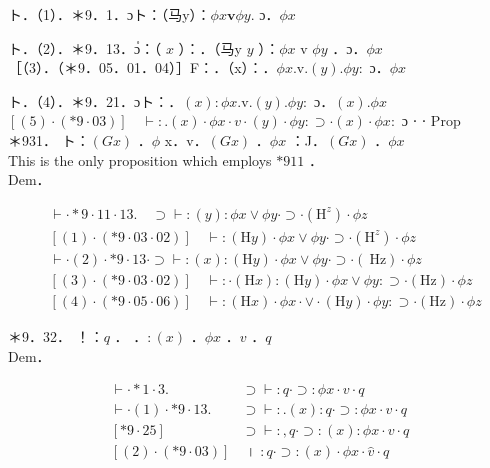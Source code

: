 \documentclass[10pt]{article}
\begin{document}
ト．（1）．＊9．1．ɔト：（马y）：$\phi x \mathbf{v} \phi y$. ɔ．$\phi x$

ト．（2）．＊9．13．ɔํ：（ $x$ ）：．（马y $y$ ）：$\phi x$ v $\phi y$ ．ɔ．$\phi x$\\
［（3）．（＊9．05．01．04）］F：．（x）：．$\phi x . \mathrm{v} .(y) . \phi y:$ ɔ．$\phi x$

ト．（4）．＊9．21．ɔト：．$(x): \phi x . \mathrm{v} .(y) . \phi y:$ ɔ．$(x) . \phi x$\\
$[(5) \cdot(* 9 \cdot 03)] \quad \vdash: .(x) \cdot \phi x \cdot v \cdot(y) \cdot \phi y: \supset \cdot(x) \cdot \phi x:$ ɔ ⋅ ⋅ Prop\\
＊931． ト：$(G x)$ ．$\phi$ x．v．$(G x)$ ．$\phi x$ ：J．$(G x)$ ．$\phi x$\\
This is the only proposition which employs $* 911$ ．\\
Dem．


\begin{align*}
& \vdash \cdot * 9 \cdot 11 \cdot 13 . \quad \supset \vdash:(y): \phi x \vee \phi y \cdot \supset \cdot\left(\mathrm{H}^{z}\right) \cdot \phi z  \tag{1}\\
& {[(1) \cdot(* 9 \cdot 03 \cdot 02)] \quad \vdash:(\mathrm{H} y) \cdot \phi x \vee \phi y \cdot \supset \cdot\left(\mathrm{H}^{z}\right) \cdot \phi z}  \tag{2}\\
& \vdash \cdot(2) \cdot * 9 \cdot 13 \cdot \supset \vdash:(x):(\mathrm{H} y) \cdot \phi x \vee \phi y \cdot \supset \cdot(\mathrm{~Hz}) \cdot \phi z  \tag{3}\\
& {[(3) \cdot(* 9 \cdot 03 \cdot 02)] \quad \vdash: \cdot(\mathrm{H} x):(\mathrm{H} y) \cdot \phi x \vee \phi y: \supset \cdot(\mathrm{Hz}) \cdot \phi z}  \tag{4}\\
& {[(4) \cdot(* 9 \cdot 05 \cdot 06)] \quad \vdash:(\mathrm{H} x) \cdot \phi x \cdot \vee \cdot(\mathrm{H} y) \cdot \phi y: \supset \cdot(\mathrm{Hz}) \cdot \phi z}
\end{align*}


＊9．32． ！：$q$ ． ．$:(x)$ ．$\phi x$ ．$v$ ．$q$\\
Dem．

\[
\begin{array}{lr}
\vdash \cdot * 1 \cdot 3 . & \supset \vdash: q \cdot \supset: \phi x \cdot v \cdot q \\
\vdash \cdot(1) \cdot * 9 \cdot 13 . & \supset \vdash: .(x): q \cdot \supset: \phi x \cdot v \cdot q \\
{[* 9 \cdot 25]} & \supset \vdash:, q \cdot \supset:(x): \phi x \cdot v \cdot q  \tag{2}\\
{[(2) \cdot(* 9 \cdot 03)]} & \text { । }: q \cdot \supset:(x) \cdot \phi x \cdot \hat{v} \cdot q
\end{array}
\]
\end{document}
